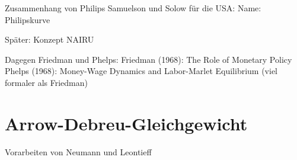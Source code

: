 Zusammenhang von Philips
Samuelson und Solow für die USA: Name: Philipskurve


Später: Konzept NAIRU


Dagegen Friedman und Phelps:
Friedman (1968): The Role of Monetary Policy
Phelps (1968): Money-Wage Dynamics and Labor-Marlet Equilibrium (viel formaler als Friedman)








\section{Arrow-Debreu-Gleichgewicht}
Vorarbeiten von Neumann und Leontieff